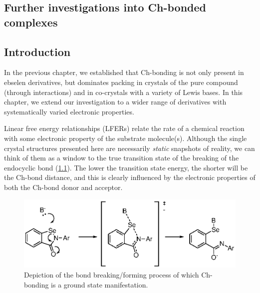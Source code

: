 \begin{refsection}

\chapter{Further investigations into Ch-bonded complexes}

\section{Introduction}
In the previous chapter, we established that Ch-bonding is not only present in ebselen derivatives, but dominates packing in crystals of the pure compound (through  interactions) and in co-crystals with a variety of Lewis bases.
In this chapter, we extend our investigation to a wider range of derivatives with systematically varied electronic properties.

Linear free energy relationships (LFERs) relate the rate of a chemical reaction with some electronic property of the substrate molecule(s).\autocite{???}
Although the single crystal structures presented here are necessarily \emph{static} snapshots of reality, we can think of them as a window to the true transition state of the breaking of the endocyclic  bond (\cref{fig:bond-breaking}).
The lower the transition state energy, the shorter will be the  Ch-bond distance, and this is clearly influenced by the electronic properties of both the Ch-bond donor and acceptor.

\begin{figure}
  \includegraphics[scale=0.74]{Figures/bond-breaking.eps}
  \caption{Depiction of the bond breaking/forming process of which Ch-bonding is a ground state manifestation.}
  \label{fig:bond-breaking}
\end{figure}


\end{refsection}

